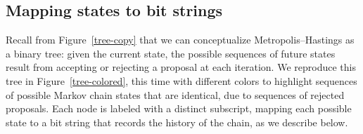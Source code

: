 \documentclass[angelino.tex]{subfiles}
\begin{document}
\subsection{Mapping states to bit strings}

Recall from Figure~\ref{tree-copy} that we can conceptualize
Metropolis--Hastings as a binary tree: given the current state,
the possible sequences of future states result from accepting or rejecting
a proposal at each iteration.
We reproduce this tree in Figure~\ref{tree-colored}, this time with different
colors to highlight sequences of possible Markov chain states that are
identical, due to sequences of rejected proposals.
Each node is labeled with a distinct subscript, mapping each possible state
to a bit string that records the history of the chain, as we describe below.
\end{document}
